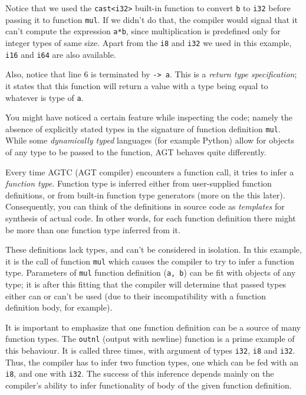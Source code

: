 \documentclass[times, utf8, diplomski]{fer}
\theoremstyle{definition}
\begin{document}
Notice that we used the \texttt{cast<i32>} built-in function to convert \texttt{b} to \texttt{i32}
before passing it to function \texttt{mul}. If we didn't do that, the compiler would signal that it can't
compute the expression \texttt{a*b}, since multiplication is predefined only for integer types of same size.
Apart from the \texttt{i8} and \texttt{i32} we used in this example, \texttt{i16} and \texttt{i64} are also
available.

Also, notice that line 6 is terminated by \texttt{-> a}. This is a \textit{return type specification};
it states that this function will return a value with a type being equal to whatever is type of \texttt{a}. 

You might have noticed a certain feature while inspecting the code; 
namely the absence of explicitly stated types in the signature of function definition \texttt{mul}.
While some \textit{dynamically typed} languages (for example Python) allow for objects of any 
type to be passed to the function, AGT behaves quite differently. 

Every time AGTC (AGT compiler) encounters a function call,
it tries to infer a \textit{function type}. Function type is inferred either from user-supplied function 
definitions, or from built-in function type generators (more on the this later).
Consequently, you can think of the definitions in source code as \textit{templates} for synthesis
of actual code. In other words, for each function definition there might be more than one
function type inferred from it.

These definitions lack types, and can't be considered in isolation.
In this example, it is the call of function \texttt{mul} which causes
the compiler to try to infer a function type.
Parameters of \texttt{mul} function definition (\texttt{a, b}) can be fit with objects of
any type; it is after this fitting that the compiler will determine that passed types either can or can't
be used (due to their incompatibility with a function definition body, for example).

It is important to emphasize that one function definition can be a source of many function types.
The \texttt{outnl} (output with newline) function is a prime example of this behaviour.
It is called three times, with argument of types \texttt{i32}, \texttt{i8} and \texttt{i32}.
Thus, the compiler has to infer two function types, 
one which can be fed with an \texttt{i8}, and one with \texttt{i32}.
The success of this inference depends mainly on the compiler's ability to infer functionality of 
body of the given function definition.
\end{document}
